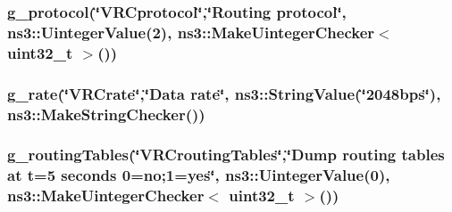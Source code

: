 \subsubsection[{\texorpdfstring{g\+\_\+protocol}{g_protocol}}]{ g\+\_\+protocol(\char`\"{}V\+R\+Cprotocol\char`\"{},\char`\"{}Routing protocol\char`\"{}, ns3\+::\+Uinteger\+Value(2), {\bf ns3\+::\+Make\+Uinteger\+Checker}$<$ uint32\+\_\+t $>$())\hspace{0.3cm}{\ttfamily [static]}}\hypertarget{vanet-routing-compare_8cc_af4c30a048d62562011e4f30ba31a4e19}{}\label{vanet-routing-compare_8cc_af4c30a048d62562011e4f30ba31a4e19}
\subsubsection[{\texorpdfstring{g\+\_\+rate}{g_rate}}]{ g\+\_\+rate(\char`\"{}V\+R\+Crate\char`\"{},\char`\"{}Data rate\char`\"{}, ns3\+::\+String\+Value(\char`\"{}2048bps\char`\"{}), ns3\+::\+Make\+String\+Checker())\hspace{0.3cm}{\ttfamily [static]}}\hypertarget{vanet-routing-compare_8cc_ad7303554f41b4be62cfd734b63cc4042}{}\label{vanet-routing-compare_8cc_ad7303554f41b4be62cfd734b63cc4042}
\subsubsection[{\texorpdfstring{g\+\_\+routing\+Tables}{g_routingTables}}]{ g\+\_\+routing\+Tables(\char`\"{}V\+R\+Crouting\+Tables\char`\"{},\char`\"{}Dump routing tables at t=5 seconds 0=no;1=yes\char`\"{}, ns3\+::\+Uinteger\+Value(0), {\bf ns3\+::\+Make\+Uinteger\+Checker}$<$ uint32\+\_\+t $>$())\hspace{0.3cm}{\ttfamily [static]}}\hypertarget{vanet-routing-compare_8cc_a990644e3b0d56c9f44ffb254f8848d3d}{}\label{vanet-routing-compare_8cc_a990644e3b0d56c9f44ffb254f8848d3d}
